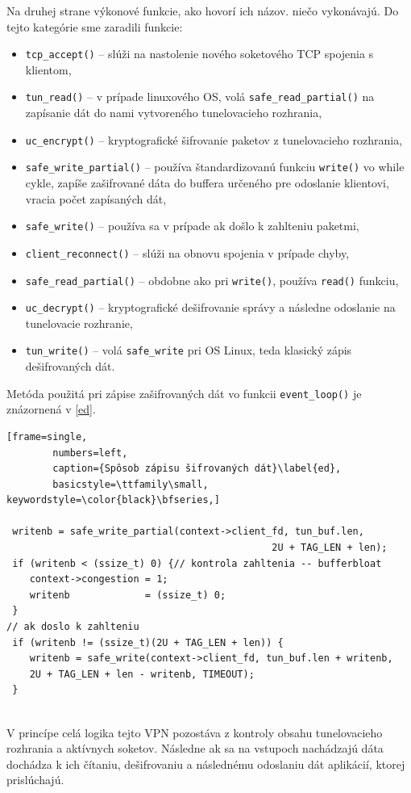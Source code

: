 Na druhej strane výkonové funkcie, ako hovorí ich názov. niečo vykonávajú. Do tejto kategórie sme zaradili funkcie:
 \begin{itemize}
 	\item\lstinline|tcp_accept()| -- slúži na nastolenie nového soketového TCP spojenia s klientom, 
 	\item\lstinline|tun_read()| -- v prípade linuxového OS, volá \lstinline|safe_read_partial()| na zapísanie dát do nami vytvoreného tunelovacieho rozhrania,
 	\item\lstinline|uc_encrypt()| -- kryptografické šifrovanie paketov z tunelovacieho rozhrania,
 	\item\lstinline|safe_write_partial()| -- používa štandardizovanú funkciu \lstinline|write()| vo while cykle, zapíše zašifrované dáta do buffera určeného pre odoslanie klientovi, vracia počet zapísaných dát,
 	\item\lstinline|safe_write()| -- používa sa v prípade ak došlo k zahlteniu paketmi,
 	\item\lstinline|client_reconnect()| -- slúži na obnovu spojenia v prípade chyby,
 	\item\lstinline|safe_read_partial()| -- obdobne ako pri \lstinline|write()|, používa \lstinline|read()| funkciu,
 	\item\lstinline|uc_decrypt()| -- kryptografické dešifrovanie správy a následne odoslanie na tunelovacie rozhranie,
 	\item\lstinline|tun_write()| -- volá \lstinline|safe_write| pri OS Linux, teda klasický zápis dešifrovaných dát.
 \end{itemize}
Metóda použitá pri zápise zašifrovaných dát vo funkcii \lstinline|event_loop()| je znázornená v \ref{ed}.

 \begin{minipage}{\linewidth} 	
 	\begin{lstlisting}[frame=single,
 		numbers=left,
 		caption={Spôsob zápisu šifrovaných dát}\label{ed},
 		basicstyle=\ttfamily\small, keywordstyle=\color{black}\bfseries,]
 		
 writenb = safe_write_partial(context->client_fd, tun_buf.len,
 			    	 		         		  2U + TAG_LEN + len); 
 if (writenb < (ssize_t) 0) {// kontrola zahltenia -- bufferbloat
 	context->congestion = 1; 
 	writenb             = (ssize_t) 0;
 }
// ak doslo k zahlteniu
 if (writenb != (ssize_t)(2U + TAG_LEN + len)) {
 	writenb = safe_write(context->client_fd, tun_buf.len + writenb,
 	2U + TAG_LEN + len - writenb, TIMEOUT); 
 }
   	\end{lstlisting}
\end{minipage}\\ 
V princípe celá logika tejto VPN pozostáva z kontroly obsahu tunelovacieho rozhrania a aktívnych soketov. Následne ak sa na vstupoch nachádzajú dáta dochádza k ich čítaniu, dešifrovaniu a následnému odoslaniu dát aplikácií, ktorej prislúchajú.

